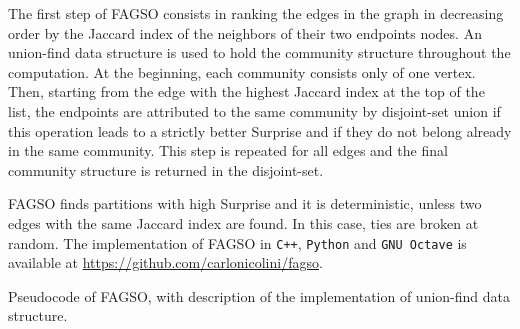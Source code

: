 The first step of FAGSO consists in ranking the edges in the graph in decreasing order by the Jaccard index of the neighbors of their two endpoints nodes.
An union-find data structure is used to hold the community structure throughout the computation.
At the beginning, each community consists only of one vertex.
Then, starting from the edge with the highest Jaccard index at the top of the list, the endpoints are attributed to the same community by disjoint-set union if this operation leads to a strictly better Surprise and if they do not belong already in the same community.
This step is repeated for all edges and the final community structure is returned in the disjoint-set.

FAGSO finds partitions with high Surprise and it is deterministic, unless two edges with the same Jaccard index are found. In this case, ties are broken at random. 
The implementation of FAGSO in \texttt{C++}, \texttt{Python} and \texttt{GNU Octave} is available at \url{https://github.com/carlonicolini/fagso}.

\begin{Algorithm}[htb!]

\caption{Pseudocode of FAGSO, with description of the implementation of union-find data structure.}
\label{alg:fagso}
\end{Algorithm}

